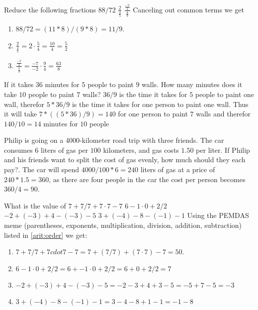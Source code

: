 \begin{ExerciseList}

\Exercise Reduce the following fractions
\Question $88/72$
\Question $\frac{2}{\frac{4}{5}}$
\Question $\frac{\frac{-7}{2}}{\frac{4}{9}}$
\Answer Canceling out common terms we get
\begin{enumerate}
\item\myindent $88/72 = (11*8)/(9*8) = 11/9$.
\item\myindent $\frac{2}{\frac{4}{5}} = 2 \cdot \frac{5}{4} = \frac{10}{4} = \frac{5}{2}$
\item\myindent $\frac{\frac{-7}{2}}{\frac{4}{9}} = \frac{-7}{-2} \cdot \frac{9}{4} = \frac{63}{8}$
\end{enumerate}

\Exercise If it takes 36 minutes for $5$ people to paint $9$ walls. How many minutes does it take $10$ people to paint $7$ walls?
\Answer $36/9$ is the time it takes for $5$ people to paint one wall, therefor $5 * 36/9$ is the time it takes for one person to paint one wall. Thus it will take $7 * ((5 * 36)/9) = 140$ for one person to paint $7$ walls and therefor $140/10 = 14$ minutes for $10$ people

\Exercise Philip is going on a 4000-kilometer road trip with three friends. The car consumes $6$ liters of gas per $100$ kilometers, and gas costs $1.50$ per liter. If Philip and his friends want to split the cost of gas evenly, how much should they each pay?.
\Answer The car will spend $4000/100 * 6 = 240$ liters of gas at a price of $240 * 1.5 = 360$, as there are four people in the car the cost per person becomes $360/4 = 90$.

\Exercise What is the value of
\Question $7 + 7/7 + 7 \cdot 7 - 7$
\Question $6 -1 \cdot 0 + 2/2$
\Question $-2 + (-3) + 4 - (-3) - 5$
\Question $3 + (-4) - 8 - (-1) - 1$
\Answer Using the PEMDAS meme (parentheses, exponents, multiplication,
division, addition, subtraction) listed in \ref{arit:order} we get:
\begin{enumerate}
 \item\myindent $7 + 7/7 + 7 cdot 7 - 7 = 7 + (7/7) + (7 \cdot 7) - 7 = 50$.
 \item\myindent $6 - 1 \cdot 0 + 2/2 = 6 + -1 \cdot 0 + 2/2 = 6 + 0 + 2/2 = 7$
 \item\myindent $-2 + (-3) + 4 - (-3) - 5 = -2 - 3 + 4 + 3 - 5 = -5 + 7 - 5 = -3$
 \item\myindent $3 + (-4) - 8 - (-1) - 1 = 3 - 4 - 8 + 1 - 1 = -1 - 8 $
\end{enumerate}


\end{ExerciseList}
